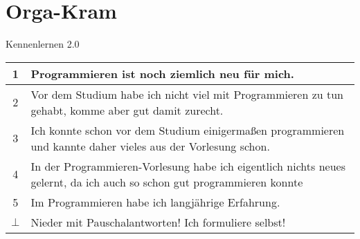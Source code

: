 




	
	\section{Orga-Kram}
	\aboutMeFrame
	
	\begin{frame}{Kennenlernen 2.0}
		\begin{tabular}{ | c | p{10.5cm} | }
			\hline
			1 & Programmieren ist noch ziemlich neu für mich. 
			\\ \hline
			2 & Vor dem Studium habe ich nicht viel mit Programmieren zu tun gehabt, komme aber gut damit zurecht.
			\\ \hline
			3 & Ich konnte schon vor dem Studium einigermaßen programmieren und kannte daher vieles aus der Vorlesung schon.
			\\ \hline
			4 & In der Programmieren-Vorlesung habe ich eigentlich nichts neues gelernt, da ich auch so schon gut programmieren konnte
			\\ \hline
			5 & Im Programmieren habe ich langjährige Erfahrung.
			\\ \hline
			$\bot$ & Nieder mit Pauschalantworten! Ich formuliere selbst!
			\\ \hline
		\end{tabular}
	\end{frame}
	
	
